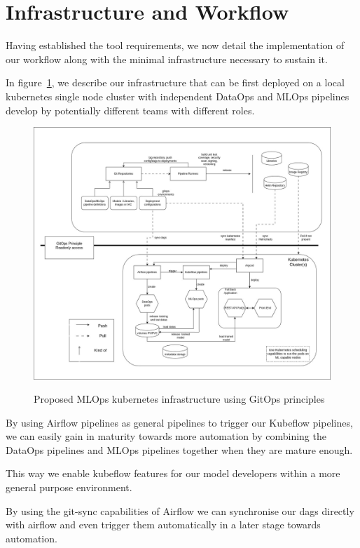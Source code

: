 \section{Infrastructure and Workflow}\label{sec:infrastructure}

Having established the tool requirements, we now detail the implementation of our workflow along with the minimal infrastructure necessary to sustain it.

In figure~\ref{fig:project-infra}, we describe our infrastructure that can be first deployed on a local kubernetes single node cluster
with independent DataOps and MLOps pipelines develop by potentially different teams with different roles.

\begin{figure}[!htbp]
    \centering
    \caption{Proposed MLOps kubernetes infrastructure using GitOps principles}
    \includegraphics[scale=0.35]{images/project/mthmlops-infra}
    \label{fig:project-infra}
\end{figure}

By using Airflow pipelines as general pipelines to trigger our Kubeflow pipelines, we can easily gain in maturity towards
more automation by combining the DataOps pipelines and MLOps pipelines together when they are mature enough.

This way we enable kubeflow features for our model developers within a more general purpose environment.

By using the git-sync capabilities of Airflow we can synchronise our dags directly with airflow and
even trigger them automatically in a later stage towards automation.

